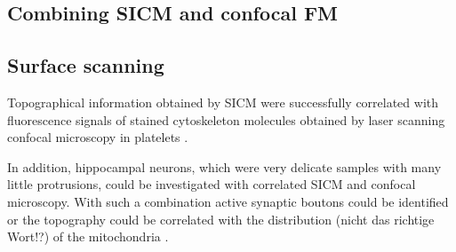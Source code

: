 


\subsection{Combining SICM and confocal FM}

\subsection{Surface scanning}

Topographical information obtained by SICM were successfully correlated with fluorescence signals
of stained cytoskeleton molecules obtained by laser scanning confocal microscopy in platelets 
\cite{Seifert2017}. 

In addition, hippocampal neurons, which were very delicate samples with many little protrusions, 
could be investigated with correlated SICM and confocal microscopy. With such a combination active
synaptic boutons could be identified \cite{Novak2013} or the topography could be correlated with 
the distribution (nicht das richtige Wort!?) of the mitochondria \cite{Takahashi2019}. 


